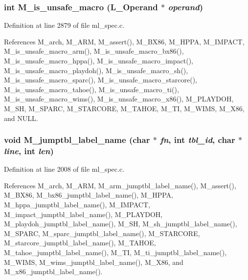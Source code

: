 \subsubsection{\setlength{\rightskip}{0pt plus 5cm}int M\_\-is\_\-unsafe\_\-macro (L\_\-Operand $\ast$ {\em operand})}\label{ml__spec_8c_f1075ea52c85b7c994e8be541eb530ab}




Definition at line 2879 of file ml\_\-spec.c.

References M\_\-arch, M\_\-ARM, M\_\-assert(), M\_\-BX86, M\_\-HPPA, M\_\-IMPACT, M\_\-is\_\-unsafe\_\-macro\_\-arm(), M\_\-is\_\-unsafe\_\-macro\_\-bx86(), M\_\-is\_\-unsafe\_\-macro\_\-hppa(), M\_\-is\_\-unsafe\_\-macro\_\-impact(), M\_\-is\_\-unsafe\_\-macro\_\-playdoh(), M\_\-is\_\-unsafe\_\-macro\_\-sh(), M\_\-is\_\-unsafe\_\-macro\_\-sparc(), M\_\-is\_\-unsafe\_\-macro\_\-starcore(), M\_\-is\_\-unsafe\_\-macro\_\-tahoe(), M\_\-is\_\-unsafe\_\-macro\_\-ti(), M\_\-is\_\-unsafe\_\-macro\_\-wims(), M\_\-is\_\-unsafe\_\-macro\_\-x86(), M\_\-PLAYDOH, M\_\-SH, M\_\-SPARC, M\_\-STARCORE, M\_\-TAHOE, M\_\-TI, M\_\-WIMS, M\_\-X86, and NULL.
\subsubsection{\setlength{\rightskip}{0pt plus 5cm}void M\_\-jumptbl\_\-label\_\-name (char $\ast$ {\em fn}, int {\em tbl\_\-id}, char $\ast$ {\em line}, int {\em len})}\label{ml__spec_8c_73b43d4ab02148047a10ea26fa00b7ac}




Definition at line 2008 of file ml\_\-spec.c.

References M\_\-arch, M\_\-ARM, M\_\-arm\_\-jumptbl\_\-label\_\-name(), M\_\-assert(), M\_\-BX86, M\_\-bx86\_\-jumptbl\_\-label\_\-name(), M\_\-HPPA, M\_\-hppa\_\-jumptbl\_\-label\_\-name(), M\_\-IMPACT, M\_\-impact\_\-jumptbl\_\-label\_\-name(), M\_\-PLAYDOH, M\_\-playdoh\_\-jumptbl\_\-label\_\-name(), M\_\-SH, M\_\-sh\_\-jumptbl\_\-label\_\-name(), M\_\-SPARC, M\_\-sparc\_\-jumptbl\_\-label\_\-name(), M\_\-STARCORE, M\_\-starcore\_\-jumptbl\_\-label\_\-name(), M\_\-TAHOE, M\_\-tahoe\_\-jumptbl\_\-label\_\-name(), M\_\-TI, M\_\-ti\_\-jumptbl\_\-label\_\-name(), M\_\-WIMS, M\_\-wims\_\-jumptbl\_\-label\_\-name(), M\_\-X86, and M\_\-x86\_\-jumptbl\_\-label\_\-name().
